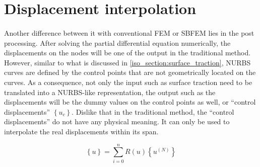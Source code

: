 \section{Displacement interpolation}
\label{iso_section:interpolation}
\paragraph{}
Another difference between it with conventional FEM or SBFEM lies in the post processing.
After solving the partial differential equation numerically, the displacements on the nodes will be one of the output in
    the traditional method.
However, similar to what is discussed in \ref{iso_section:surface_traction}, NURBS curves are defined by the control points
    that are not geometrically located on the curves.
As a consequence, not only the input such as surface traction need to be translated into a NURBS-like representation, the
    output such as the displacements will be the dummy values on the control points as well, or ``control displacements''
    $\left\{ u_c \right\}$.
Dislike that in the traditional method, the ``control displacements'' do not have any physical meaning. It can only be used
    to interpolate the real displacements within its span.

\begin{equation}
    \left\{ u \right\}=
    \sum_{i=0}^n
    R(u) \left\{u^{(N)}\right\}
\label{iso_eq:displacement_interpolation}
\end{equation}
